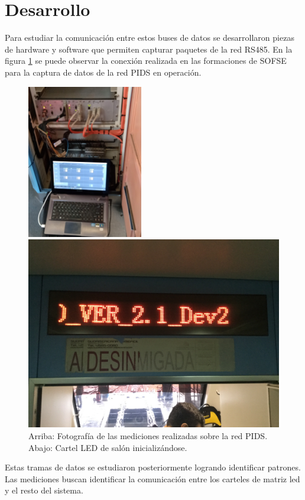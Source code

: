 \documentclass[conference]{IEEEtran}
\begin{document}
\section{Desarrollo}

Para estudiar la comunicación entre estos buses de datos se desarrollaron piezas de hardware y software que permiten capturar paquetes de la red RS485. En la figura  \ref{fig.fotosTren} se puede observar la conexión realizada en las formaciones de SOFSE para la captura de datos de la red PIDS en operación.\\

\begin{figure}[htbp]
\centerline{\includegraphics[width=0.45\textwidth]{fotoSetupTren.jpg}}
\vspace{0.4cm}
\centerline{\includegraphics[width=.45\textwidth]{fotoCartelSalon.JPG}}
\caption{Arriba: Fotografía de las mediciones realizadas sobre la red PIDS. Abajo: Cartel LED de salón inicializándose.}
\label{fig.fotosTren}
\end{figure}

Estas tramas de datos se estudiaron posteriormente logrando identificar patrones. Las mediciones buscan identificar la comunicación entre los carteles de matriz led y el resto del sistema. \\
\end{document}
